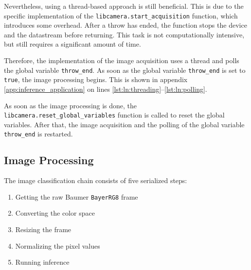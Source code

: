 Nevertheless, using a thread-based approach is still beneficial.
This is due to the specific implementation of the \texttt{libcamera.start\_acquisition} function, which introduces some overhead.
After a throw has ended, the function stops the device and the datastream before returning.
This task is not computationally intensive, but still requires a significant amount of time.

Therefore, the implementation of the image acquisition uses a thread and polls the global variable \texttt{throw\_end}.
As soon as the global variable \texttt{throw\_end} is set to \texttt{true}, the image processing begins.
This is shown in appendix \ref{app:inference_application} on lines \ref{lst:ln:threading}--\ref{lst:ln:polling}.

As soon as the image processing is done, the \texttt{libcamera.reset\_global\_variables} function is called to reset the global variables.
After that, the image acquisition and the polling of the global variable \texttt{throw\_end} is restarted.


\subsection{Image Processing}
\label{subsec:inference:app:image_processing}

The image classification chain consists of five serialized steps:
\begin{enumerate}
  \item Getting the raw Baumer \texttt{BayerRG8} frame
  \item Converting the color space
  \item Resizing the frame
  \item Normalizing the pixel values
  \item Running inference
\end{enumerate}

